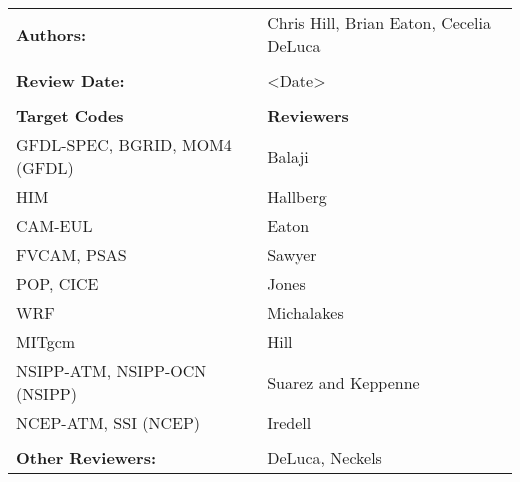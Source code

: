 %

\begin{tabular}{l l}

{\bf Authors:} & Chris Hill, Brian Eaton, Cecelia DeLuca \\ \\

{\bf Review Date:}            & <Date> \\ \\

{\bf Target Codes}            & {\bf Reviewers} \\
GFDL-SPEC, BGRID, MOM4 (GFDL) & Balaji \\ 
HIM                           & Hallberg \\
CAM-EUL                       & Eaton \\
FVCAM, PSAS                   & Sawyer \\
POP, CICE                     & Jones \\
WRF                           & Michalakes \\
MITgcm                        & Hill \\
NSIPP-ATM, NSIPP-OCN (NSIPP)  & Suarez and Keppenne\\
NCEP-ATM, SSI (NCEP)          & Iredell \\ \\

{\bf Other Reviewers:}        & DeLuca, Neckels

\end{tabular}

